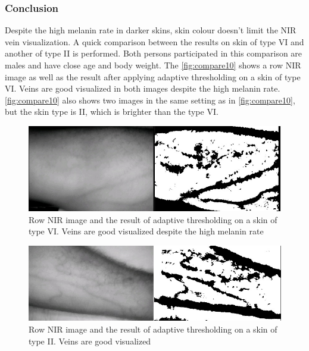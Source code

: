 \subsubsection{Conclusion}
Despite the high melanin rate in darker skins, skin colour doesn’t limit the NIR vein visualization. A quick comparison between the results on skin of type VI and another of type II is performed. Both persons participated in this comparison are males and have close age and body weight.
The \autoref{fig:compare10} shows a row NIR image as well as the result after applying adaptive thresholding on a skin of type VI. Veins are good visualized in both images despite the high melanin rate. \autoref{fig:compare10} also shows two images in the same setting as in \autoref{fig:compare10}, but the skin type is II, which is brighter than the type VI.





\begin{figure}[H]
\centering
\includegraphics[scale=0.8]{figures/compare10.jpg}
\caption[Row NIR image and the result of adaptive thresholding on a skin of type VI]{Row NIR image and the result of adaptive thresholding on a skin of type VI. Veins are good visualized despite the high melanin rate}\label{fig:compare10}
\end{figure}

\begin{figure}[H]
\centering
\includegraphics[scale=0.8]{figures/compare11.JPG}
\caption[Row NIR image and the result of adaptive thresholding on a skin of type II]{Row NIR image and the result of adaptive thresholding on a skin of type II. Veins are good visualized}\label{fig:compare11}
\end{figure}

